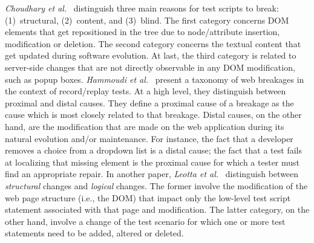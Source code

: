 \textit{Choudhary et al.}~\cite{Choudhary:2011:WWA:2002931.2002935} distinguish three main reasons for test scripts to break: (1)~structural, (2)~content, and (3)~blind. The first category concerns DOM elements that get repositioned in the tree due to node/attribute insertion, modification or deletion. The second category concerns the textual content that get updated during software evolution. At last, the third category is related to server-side changes that are not directly observable in any DOM modification, such as popup boxes.
\textit{Hammoudi et al.}~\cite{Hammoudi-2016-ICST} present a taxonomy of web breakages in the context of record/replay tests. At a high level, they distinguish between proximal and distal causes. They define a proximal cause of a breakage as the cause which is most closely related to that breakage. Distal causes, on the other hand, are the modification that are made on the web application during its natural evolution and/or maintenance. For instance, the fact that a developer removes a choice from a dropdown list is a distal cause; the fact that a test fails at localizing that missing element is the proximal cause for which a tester must find an appropriate repair. 
%
In another paper, \textit{Leotta et al.}~\cite{2016-leotta-Advances} distinguish between \textit{structural} changes and \textit{logical} changes. The former involve the modification of the web page structure (i.e., the DOM) that impact only the low-level test script statement associated with that page and modification. The latter category, on the other hand, involve a change of the test scenario for which one or more test statements need to be added, altered or deleted.

